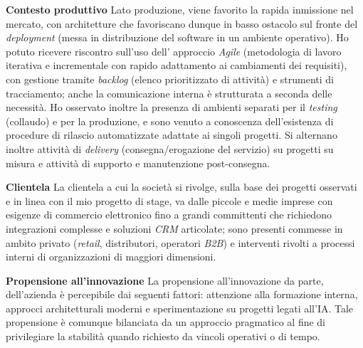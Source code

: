 \medskip
\noindent\textbf{Contesto produttivo}
Lato produzione, viene favorito la rapida inmissione nel mercato, con architetture che favoriscano dunque in basso ostacolo sul fronte del \emph{deployment} (messa in distribuzione del software in un ambiente operativo).
Ho potuto ricevere riscontro sull'uso dell' approccio \emph{Agile} (metodologia di lavoro iterativa e incrementale con rapido adattamento ai cambiamenti dei requisiti), con gestione tramite \emph{backlog} (elenco prioritizzato di attività) e strumenti di tracciamento; 
anche la comunicazione interna è strutturata a seconda delle necessità. Ho osservato inoltre la presenza di 
ambienti separati per il \emph{testing} (collaudo) e  per la produzione, e sono venuto a conoscenza dell'esistenza di procedure di rilascio automatizzate adattate ai singoli progetti.
Si alternano inoltre attività di \emph{delivery} (consegna/erogazione del servizio) su progetti su misura e attività di supporto e manutenzione post-consegna. 

\medskip
\noindent\textbf{Clientela}
La clientela a cui la società si rivolge, sulla base dei progetti osservati e in linea con il mio progetto di stage, va dalle piccole e medie imprese con esigenze di commercio 
elettronico fino a grandi committenti che richiedono integrazioni complesse e soluzioni \emph{CRM} articolate; sono presenti commesse in ambito privato (\emph{retail}, 
distributori, operatori \emph{B2B}) e interventi rivolti a processi interni di organizzazioni di maggiori dimensioni.

\medskip
\noindent\textbf{Propensione all'innovazione}
La propensione all'innovazione da parte, dell'azienda è percepibile dai seguenti fattori: attenzione alla formazione interna, approcci architetturali moderni e sperimentazione su progetti legati all'IA.
Tale propensione è comunque bilanciata da un approccio pragmatico al fine di privilegiare la stabilità quando richiesto da vincoli operativi o di tempo. 

